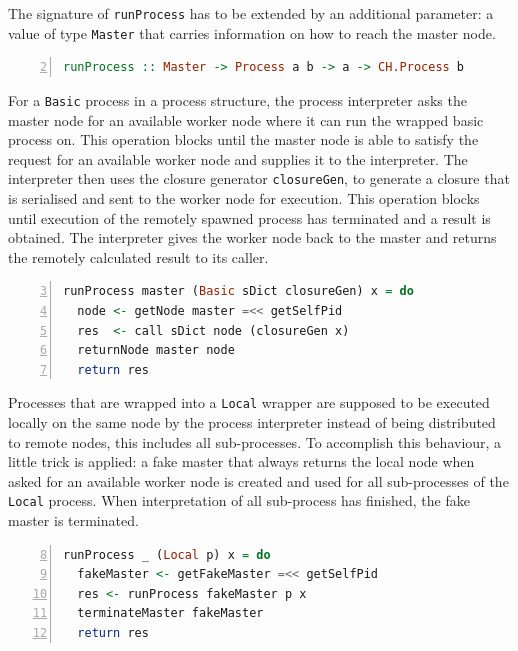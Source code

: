 The signature of \texttt{runProcess} has to be extended by an additional parameter: a value of type \texttt{Master} that carries information on how to reach the master node.
\begin{lstlisting}[language=Haskell,caption=Signature of the process interpreter.,label=lst:interpreter_signature,numbers=left,frame=bt,firstnumber=2]
runProcess :: Master -> Process a b -> a -> CH.Process b
\end{lstlisting}

For a \texttt{Basic} process in a process structure, the process interpreter asks the master node for an available worker node where it can run the wrapped basic process on. This operation blocks until the master node is able to satisfy the request for an available worker node and supplies it to the interpreter. The interpreter then uses the closure generator \texttt{closureGen}, to generate a closure that is serialised and sent to the worker node for execution. This operation blocks until execution of the remotely spawned process has terminated and a result is obtained. The interpreter gives the worker node back to the master and returns the remotely calculated result to its caller.
\begin{lstlisting}[language=Haskell,caption=Implementation of the interpreter for \texttt{Basic} processes.,label=lst:runprocess_simple,numbers=left,frame=bt,firstnumber=3]
runProcess master (Basic sDict closureGen) x = do
  node <- getNode master =<< getSelfPid
  res  <- call sDict node (closureGen x)
  returnNode master node
  return res
\end{lstlisting}

Processes that are wrapped into a \texttt{Local} wrapper are supposed to be executed locally on the same node by the process interpreter instead of being distributed to remote nodes, this includes all sub-processes. To accomplish this behaviour, a little trick is applied: a fake master that always returns the local node when asked for an available worker node is created and used for all sub-processes of the \texttt{Local} process. When interpretation of all sub-process has finished, the fake master is terminated.
\begin{lstlisting}[language=Haskell,caption=Implementation of the interpreter for \texttt{Local} processes.,label=lst:runprocess_local,numbers=left,frame=bt,firstnumber=8]
runProcess _ (Local p) x = do
  fakeMaster <- getFakeMaster =<< getSelfPid
  res <- runProcess fakeMaster p x
  terminateMaster fakeMaster
  return res
\end{lstlisting}

